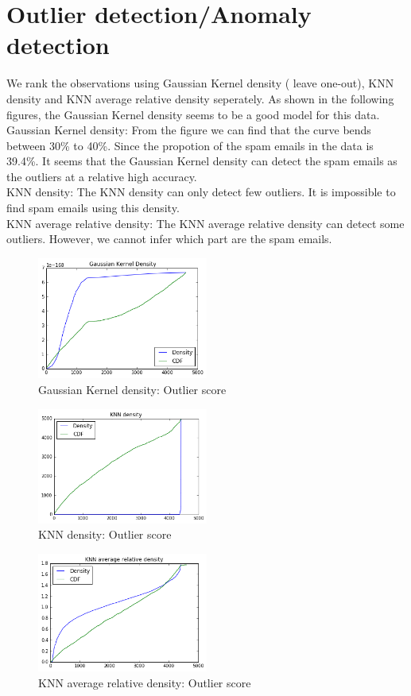 \section{Outlier detection/Anomaly detection}
We rank the observations using Gaussian Kernel density ( leave one-out), KNN density and KNN average relative density seperately. As shown in the following figures, the Gaussian Kernel density seems to be a good model for this data. ~\\

Gaussian Kernel density: From the figure we can find that the curve bends between 30\% to 40\%. Since the propotion of the spam emails in the data is 39.4\%. It seems that the Gaussian Kernel density can detect the spam emails as the outliers at a relative high accuracy.~\\

KNN density: The KNN density can only detect few outliers. It is impossible to find spam emails using this density.~\\

KNN average relative density: The KNN average relative density can detect some outliers. However, we cannot infer which part are the spam emails.

\begin{figure}[!ht]
	\centering
	\includegraphics[width=0.5\textwidth]{Fig/gaussian.png}
	\vspace{-5pt}
	\caption{Gaussian Kernel density: Outlier score}
\end{figure}

\begin{figure}[!ht]
	\centering
	\includegraphics[width=0.5\textwidth]{Fig/knn.png}
	\vspace{-5pt}
	\caption{KNN density: Outlier score}
\end{figure}

\begin{figure}[!ht]
	\centering
	\includegraphics[width=0.5\textwidth]{Fig/knn_average.png}
	\vspace{-5pt}
	\caption{KNN average relative density: Outlier score}
\end{figure}
